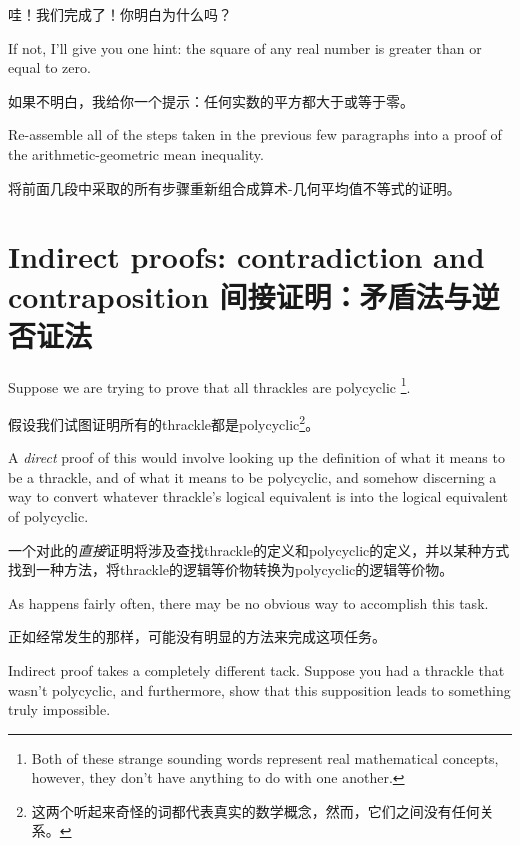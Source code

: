 哇！我们完成了！你明白为什么吗？

If not, I'll give you one
hint:  the square of any real number is greater than or equal to
zero.

如果不明白，我给你一个提示：任何实数的平方都大于或等于零。

\begin{exer} 
Re-assemble all of the steps taken in the previous few paragraphs
into a proof of the arithmetic-geometric mean inequality.

将前面几段中采取的所有步骤重新组合成算术-几何平均值不等式的证明。
\end{exer}

 
\clearpage




\newpage


\section[Contradiction and contraposition]{Indirect proofs: contradiction and contraposition 间接证明：矛盾法与逆否证法}
\label{sec:contra}

Suppose we are trying to prove that all thrackles are polycyclic
\footnote{Both of these strange sounding words represent real 
mathematical concepts, however, they don't have anything to do 
with one another.}.

假设我们试图证明所有的thrackle都是polycyclic\footnote{这两个听起来奇怪的词都代表真实的数学概念，然而，它们之间没有任何关系。}。

A {\em direct} proof of this would involve looking up the definition
of what it means to be a thrackle, and of what it means to be polycyclic,
and somehow discerning a way to convert whatever thrackle's logical equivalent
is into the logical equivalent of polycyclic.

一个对此的{\em 直接}证明将涉及查找thrackle的定义和polycyclic的定义，并以某种方式找到一种方法，将thrackle的逻辑等价物转换为polycyclic的逻辑等价物。

As happens fairly often,
there may be no obvious way to accomplish this task.

正如经常发生的那样，可能没有明显的方法来完成这项任务。

Indirect proof takes 
a completely different tack.  Suppose you had a thrackle that wasn't 
polycyclic, and furthermore, show that this supposition leads to something
truly impossible.

